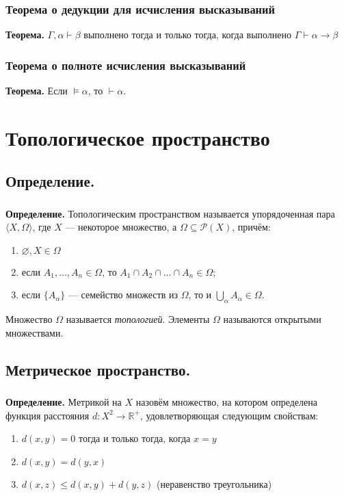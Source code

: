 \documentclass[10pt,a4paper,oneside]{article}
\begin{document}
\subsubsection{Теорема о дедукции для исчисления высказываний}

\noindent \textbf{ Теорема. }
$\Gamma,\alpha\vdash\beta$ выполнено тогда и только тогда, когда выполнено $\Gamma\vdash\alpha\rightarrow\beta$

\subsubsection{Теорема о полноте исчисления высказываний}
\noindent \textbf{ Теорема. }
Если $\models\alpha$, то $\vdash\alpha$.

\section{Топологическое пространство}
\subsection{Определение.}
\subsubsection{}
\noindent \textbf{ Определение. }
Топологическим пространством называется упорядоченная пара $\langle X, \Omega \rangle$,
где $X$ --- некоторое множество, а $\Omega \subseteq \mathcal{P}(X)$, причём:
\begin{enumerate}
\item $\varnothing, X \in \Omega$
\item если $A_1, \dots, A_n \in \Omega$, то $A_1 \cap A_2 \cap \dots \cap A_n \in \Omega$;
\item если $\{A_\alpha\}$ --- семейство множеств из $\Omega$, то и $\bigcup_\alpha A_\alpha \in \Omega$.
\end{enumerate}

Множество $\Omega$ называется \emph{топологией}.
Элементы $\Omega$ называются открытыми множествами.

\subsection{Метрическое пространство.}
\subsubsection{}
\noindent \textbf{ Определение. }
Метрикой на $X$ назовём множество, на котором определена функция расстояния $d: X^2 \rightarrow \mathbb{R}^+$, 
удовлетворяющая следующим свойствам:
\begin{enumerate}
\item $d(x,y) = 0$ тогда и только тогда, когда $x = y$
\item $d(x,y) = d(y,x)$
\item $d(x,z) \le d(x,y) + d(y,z)$ (неравенство треугольника)
\end{enumerate}
\end{document}
